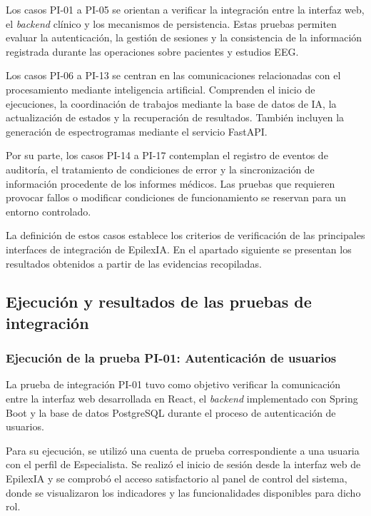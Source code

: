 Los casos PI-01 a PI-05 se orientan a verificar la integración entre la interfaz web, el \textit{backend} clínico y los mecanismos de persistencia. Estas pruebas permiten evaluar la autenticación, la gestión de sesiones y la consistencia de la información registrada durante las operaciones sobre pacientes y estudios EEG.

Los casos PI-06 a PI-13 se centran en las comunicaciones relacionadas con el procesamiento mediante inteligencia artificial. Comprenden el inicio de ejecuciones, la coordinación de trabajos mediante la base de datos de IA, la actualización de estados y la recuperación de resultados. También incluyen la generación de espectrogramas mediante el servicio FastAPI.

Por su parte, los casos PI-14 a PI-17 contemplan el registro de eventos de auditoría, el tratamiento de condiciones de error y la sincronización de información procedente de los informes médicos. Las pruebas que requieren provocar fallos o modificar condiciones de funcionamiento se reservan para un entorno controlado.


La definición de estos casos establece los criterios de verificación de las principales interfaces de integración de EpilexIA. En el apartado siguiente se presentan los resultados obtenidos a partir de las evidencias recopiladas.


\subsection{Ejecución y resultados de las pruebas de integración}

\subsubsection{Ejecución de la prueba PI-01: Autenticación de usuarios}

La prueba de integración PI-01 tuvo como objetivo verificar la comunicación entre la interfaz web desarrollada en React, el \textit{backend} implementado con Spring Boot y la base de datos PostgreSQL durante el proceso de autenticación de usuarios.

Para su ejecución, se utilizó una cuenta de prueba correspondiente a una usuaria con el perfil de Especialista. Se realizó el inicio de sesión desde la interfaz web de EpilexIA y se comprobó el acceso satisfactorio al panel de control del sistema, donde se visualizaron los indicadores y las funcionalidades disponibles para dicho rol.

